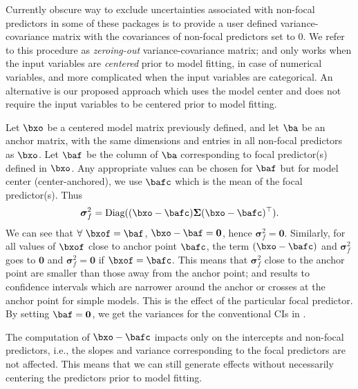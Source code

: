  Currently obscure way to exclude uncertainties associated with non-focal predictors in some of these packages is to provide a user defined variance-covariance matrix with the covariances of non-focal predictors set to $0$. We refer to this procedure as \emph{zeroing-out} variance-covariance matrix; and only works when the input variables are \emph{centered} prior to model fitting, in case of numerical variables, and more complicated when the input variables are categorical. An alternative is our proposed approach which uses the model center and does not require the input variables to be centered prior to model fitting.

Let $\bxo$ be a centered model matrix previously defined, and let $\ba$ be an anchor matrix, with the same dimensions and entries in all non-focal predictors as $\bxo$. Let $\baf$ be the column of $\ba$ corresponding to focal predictor(s) defined in $\bxo$. Any appropriate values can be chosen for $\baf$ but for model center (center-anchored), we use $\bafc$ which is the mean of the focal predictor(s). Thus 
%
\begin{align}\label{eq:centered_variance}
\boldsymbol\sigma_f^2 = \textrm{Diag}((\bxo - \bafc) \boldsymbol{\Sigma} (\bxo - \bafc)^\top).
\end{align}
%
We can see that $\forall ~\bxof=\baf$, $\bxo - \baf = \boldsymbol 0$, hence $\boldsymbol\sigma_f^2 = \boldsymbol{0}$. Similarly, for all values of $\bxof$ close to anchor point $\bafc$, the term $(\bxo - \bafc)$ and $\boldsymbol\sigma_f^2$ goes to $\boldsymbol 0$ and $\boldsymbol\sigma_f^2 = \boldsymbol 0$ if $\bxof=\bafc$. This means that $\boldsymbol\sigma_f^2$ close to the anchor point are smaller than those away from the anchor point; and results to confidence intervals which are narrower around the anchor or crosses at the anchor point for simple models. This is the effect of the particular focal predictor. By setting $\baf = \boldsymbol 0$, we get the variances for the conventional CIs in .


The computation of $\bxo - \bafc$ impacts only on the intercepts and non-focal predictors, i.e., the slopes and variance corresponding to the focal predictors are not affected. This means that we can still generate effects without necessarily centering the predictors prior to model fitting.

